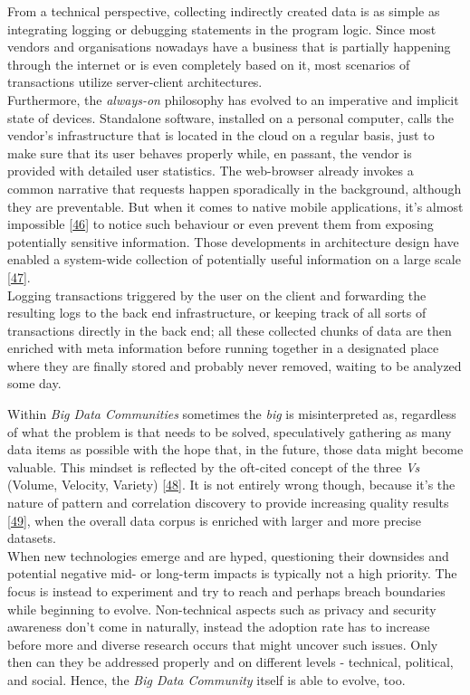 \documentclass[12pt,english,a4paper,titlepage,cleardoublepage=empty,dottedtoc]{report}
\begin{document}
From a technical perspective, collecting indirectly created data is as
simple as integrating logging or debugging statements in the program
logic. Since most vendors and organisations nowadays have a business
that is partially happening through the internet or is even completely
based on it, most scenarios of transactions utilize server-client
architectures.\\
Furthermore, the \emph{always-on} philosophy has evolved to an
imperative and implicit state of devices. Standalone software, installed
on a personal computer, calls the vendor's infrastructure that is
located in the cloud on a regular basis, just to make sure that its user
behaves properly while, en passant, the vendor is provided with detailed
user statistics. The web-browser already invokes a common narrative that
requests happen sporadically in the background, although they are
preventable. But when it comes to native mobile applications, it's
almost impossible {[}\protect\hyperlink{ref-web_2016_answers-io}{46}{]}
to notice such behaviour or even prevent them from exposing potentially
sensitive information. Those developments in architecture design have
enabled a system-wide collection of potentially useful information on a
large scale
{[}\protect\hyperlink{ref-web_2016_big-data-enthusiasts-should-not-ignore}{47}{]}.\\
Logging transactions triggered by the user on the client and forwarding
the resulting logs to the back end infrastructure, or keeping track of
all sorts of transactions directly in the back end; all these collected
chunks of data are then enriched with meta information before running
together in a designated place where they are finally stored and
probably never removed, waiting to be analyzed some day.

Within \emph{Big Data Communities} sometimes the \emph{big} is
misinterpreted as, regardless of what the problem is that needs to be
solved, speculatively gathering as many data items as possible with the
hope that, in the future, those data might become valuable. This mindset
is reflected by the oft-cited concept of the three \emph{Vs} (Volume,
Velocity, Variety)
{[}\protect\hyperlink{ref-report_2001_3d-data-management-controlling-data-volume-velocity-and-variety}{48}{]}.
It is not entirely wrong though, because it's the nature of pattern and
correlation discovery to provide increasing quality results
{[}\protect\hyperlink{ref-paper_2015_big-data-for-development-a-review-of-promises-and-challenges:more-data}{49}{]},
when the overall data corpus is enriched with larger and more precise
datasets.\\
When new technologies emerge and are hyped, questioning their downsides
and potential negative mid- or long-term impacts is typically not a high
priority. The focus is instead to experiment and try to reach and
perhaps breach boundaries while beginning to evolve. Non-technical
aspects such as privacy and security awareness don't come in naturally,
instead the adoption rate has to increase before more and diverse
research occurs that might uncover such issues. Only then can they be
addressed properly and on different levels - technical, political, and
social. Hence, the \emph{Big Data Community} itself is able to evolve,
too.
\end{document}
